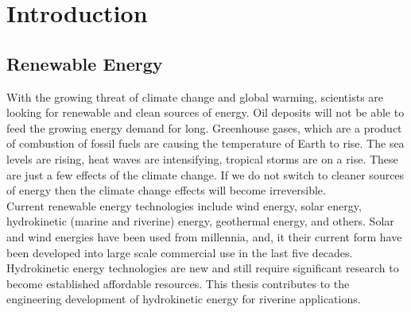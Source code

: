 
\chapter{Introduction} %

\label{Chapter1} %


\newcommand{\keyword}[1]{\textbf{#1}}
\newcommand{\tabhead}[1]{\textbf{#1}}
\newcommand{\code}[1]{\texttt{#1}}
\newcommand{\file}[1]{\texttt{\bfseries#1}}
\newcommand{\option}[1]{\texttt{\itshape#1}}


\section{Renewable Energy}
With the growing threat of climate change and global warming, scientists are looking for renewable and clean sources of energy. Oil deposits will not be able to feed the growing energy demand for long. Greenhouse gases, which are a product of combustion of fossil fuels are causing the temperature of Earth to rise. The sea levels are rising, heat waves are intensifying, tropical storms are on a rise. These are just a few effects of the climate change. If we do not switch to cleaner sources of energy then the climate change effects will become irreversible. \\ %

Current renewable energy technologies include wind energy, solar energy, hydrokinetic (marine and riverine) energy, geothermal energy, and others. Solar and wind energies have been used from millennia, and, it their current form have been developed into large scale commercial use in the last five decades. Hydrokinetic energy technologies are new and still require significant research to become established affordable resources. This thesis contributes to the engineering development of hydrokinetic energy for riverine applications.

